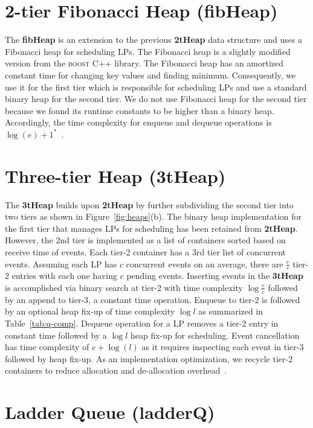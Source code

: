 \section{2-tier Fibonacci Heap (fibHeap)} 
The \textbf{fibHeap} is an extension to the previous \textbf{2tHeap} data structure and uses a Fibonacci heap for scheduling LPs. The Fibonacci heap is a slightly modified version from the \textsc{boost} C++ library. The Fibonacci heap has an amortized constant time for changing key values and finding minimum. Consequently, we use it for the first tier which is responsible for scheduling LPs and use a standard binary heap for the second tier.  We do not use Fibonacci heap for the second tier because we found its runtime constants to be higher than a binary heap.  Accordingly, the time complexity for enqueue and dequeue operations is $\log(e) + 1^{*}$~\cite{higiro2017multi}.

\section{Three-tier Heap (3tHeap)} 
The \textbf{3tHeap} builds upon \textbf{2tHeap} by further subdividing the second tier into two tiers as shown in Figure~\ref{fig:heaps}(b). The binary heap implementation for the first tier that manages LPs for scheduling has been retained from \textbf{2tHeap}. However, the 2nd tier is implemented as a list of containers sorted based on receive time of events. Each tier-2 container has a 3rd tier list of concurrent events. Assuming each LP has $c$ concurrent events on an average, there are $\frac{e}{c}$ tier-2 entries with each one having $c$ pending events. Inserting events in the \textbf{3tHeap} is accomplished via binary search at tier-2 with time complexity $\log\frac{e}{c}$ followed by an append to tier-3, a constant time operation. Enqueue to tier-2 is followed by an optional heap fix-up of time complexity $\log l$ as summarized in Table~\ref{tab:q-comp}. Dequeue operation for a LP removes a tier-2 entry in constant time followed by a $\log l$ heap fix-up for scheduling. Event cancellation has time complexity of $e + \log(l)$ as it requires inspecting each event in tier-3 followed by heap fix-up. As an implementation optimization, we recycle tier-2 containers to reduce allocation and de-allocation overhead~\cite{higiro2017multi}.

\section{Ladder Queue (ladderQ)} 

